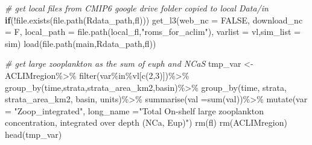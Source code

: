 \documentclass[
]{article}
\newenvironment{Shaded}{\begin{snugshade}}{\end{snugshade}}
\newcommand{\AttributeTok}[1]{\textcolor[rgb]{0.77,0.63,0.00}{#1}}
\newcommand{\CommentTok}[1]{\textcolor[rgb]{0.56,0.35,0.01}{\textit{#1}}}
\newcommand{\ConstantTok}[1]{\textcolor[rgb]{0.00,0.00,0.00}{#1}}
\newcommand{\ControlFlowTok}[1]{\textcolor[rgb]{0.13,0.29,0.53}{\textbf{#1}}}
\newcommand{\DecValTok}[1]{\textcolor[rgb]{0.00,0.00,0.81}{#1}}
\newcommand{\FunctionTok}[1]{\textcolor[rgb]{0.00,0.00,0.00}{#1}}
\newcommand{\NormalTok}[1]{#1}
\newcommand{\OtherTok}[1]{\textcolor[rgb]{0.56,0.35,0.01}{#1}}
\newcommand{\SpecialCharTok}[1]{\textcolor[rgb]{0.00,0.00,0.00}{#1}}
\newcommand{\StringTok}[1]{\textcolor[rgb]{0.31,0.60,0.02}{#1}}
\begin{document}
\begin{Shaded}
\begin{Highlighting}[]
  \CommentTok{\# get local files from CMIP6 google drive folder copied to local Data/in}
  \ControlFlowTok{if}\NormalTok{(}\SpecialCharTok{!}\FunctionTok{file.exists}\NormalTok{(}\FunctionTok{file.path}\NormalTok{(Rdata\_path,fl)))}
    \FunctionTok{get\_l3}\NormalTok{(}\AttributeTok{web\_nc =} \ConstantTok{FALSE}\NormalTok{, }\AttributeTok{download\_nc =}\NormalTok{ F,}
           \AttributeTok{local\_path =} \FunctionTok{file.path}\NormalTok{(local\_fl,}\StringTok{"roms\_for\_aclim"}\NormalTok{),}
           \AttributeTok{varlist =}\NormalTok{ vl,}\AttributeTok{sim\_list =}\NormalTok{ sim)}
  \FunctionTok{load}\NormalTok{(}\FunctionTok{file.path}\NormalTok{(main,Rdata\_path,fl))}

  \CommentTok{\# get large zooplankton as the sum of euph and NCaS}
\NormalTok{  tmp\_var    }\OtherTok{\textless{}{-}}\NormalTok{ ACLIMregion}\SpecialCharTok{\%\textgreater{}\%}
    \FunctionTok{filter}\NormalTok{(var}\SpecialCharTok{\%in\%}\NormalTok{vl[}\FunctionTok{c}\NormalTok{(}\DecValTok{2}\NormalTok{,}\DecValTok{3}\NormalTok{)])}\SpecialCharTok{\%\textgreater{}\%}
    \FunctionTok{group\_by}\NormalTok{(time,strata,strata\_area\_km2,basin)}\SpecialCharTok{\%\textgreater{}\%}
    \FunctionTok{group\_by}\NormalTok{(time,}
\NormalTok{             strata,}
\NormalTok{             strata\_area\_km2,}
\NormalTok{             basin,}
\NormalTok{             units)}\SpecialCharTok{\%\textgreater{}\%}
    \FunctionTok{summarise}\NormalTok{(}\AttributeTok{val =}\FunctionTok{sum}\NormalTok{(val))}\SpecialCharTok{\%\textgreater{}\%}
    \FunctionTok{mutate}\NormalTok{(}\AttributeTok{var       =} \StringTok{"Zoop\_integrated"}\NormalTok{,}
           \AttributeTok{long\_name =}\StringTok{"Total On{-}shelf }
\StringTok{               large zooplankton concentration, }
\StringTok{               integrated over depth (NCa, Eup)"}\NormalTok{)}
  \FunctionTok{rm}\NormalTok{(fl)}
  \FunctionTok{rm}\NormalTok{(ACLIMregion)}
  \FunctionTok{head}\NormalTok{(tmp\_var)}
  

\end{Highlighting}
\end{Shaded}
\end{document}
